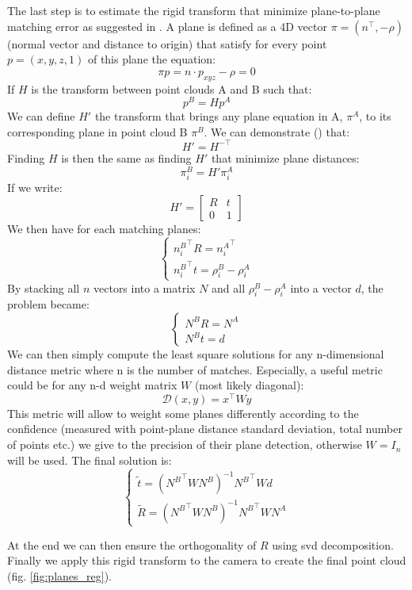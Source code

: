 The last step is to estimate the rigid transform that minimize plane-to-plane matching error as suggested in \cite{khoshelham2016}. 
\newline
A plane is defined as a 4D vector $\pi=(n^\top, -\rho)$ (normal vector and distance to origin) that satisfy for every point $p=(x, y, z, 1)$ of this plane the equation:
\[\pi p = n\cdot p_{xyz} - \rho = 0\]
If $H$ is the transform between point clouds A and B such that:
\[p^B = Hp^A\]
We can define $H'$ the transform that brings any plane equation in A, $\pi^A$, to its corresponding plane in point cloud B $\pi^{B}$. We can demonstrate () that: \[H'=H^{-\top}\]
Finding $H$ is then the same as finding $H'$ that minimize plane distances: \[\pi^B_i=H'\pi^A_i\]
If we write:
\[H'=\begin{bmatrix}
R & t\\ 
0 & 1
\end{bmatrix}\]
We then have for each matching planes:
\[\left\{\begin{matrix}
{n_i^B}^\top R={n_i^A}^\top\\ 
{n_i^B}^\top t=\rho_i^B-\rho_i^A
\end{matrix}\right.\]
By stacking all $n$ vectors into a matrix $N$ and all $\rho_i^B-\rho_i^A$ into a vector $d$, the problem became:
\[\left\{\begin{matrix}
N^BR=N^A\\ 
N^Bt=d
\end{matrix}\right.\]
We can then simply compute the least square solutions for any n-dimensional distance metric where n is the number of matches. Especially, a useful metric could be for any n-d weight matrix $W$ (most likely diagonal):
\[\mathcal{D}(x,y)=x^\top Wy\]
This metric will allow to weight some planes differently according to the confidence (measured with point-plane distance standard deviation, total number of points etc.) we give to the precision of their plane detection, otherwise $W=I_n$ will be used.
The final solution is:
\[\left\{\begin{matrix}
\tilde{t}=({N^B}^\top WN^B)^{-1}{N^B}^\top Wd\\ 
\tilde{R}=({N^B}^\top WN^B)^{-1}{N^B}^\top WN^A
\end{matrix}\right.\]

At the end we can then ensure the orthogonality of $R$ using \acrshort{svd} decomposition. Finally we apply this rigid transform to the camera to create the final point cloud (fig. \ref{fig:planes_reg}).\\

